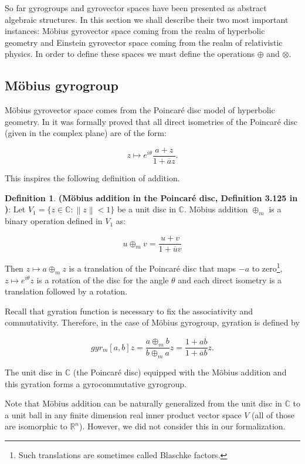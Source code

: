\documentclass[a4paper]{article}
\theoremstyle{definition}
\newtheorem{definition}{Definition}[section]
\newcommand{\norm}[1]{\left\lVert#1\right\rVert}
\begin{document}
So far gyrogroups and gyrovector spaces have been presented as
abstract algebraic structures. In this section we shall describe their
two most important instances: M\"obius gyrovector space coming from
the realm of hyperbolic geometry and Einstein gyrovector space coming
from the realm of relativistic physics. In order to define these
spaces we must define the operations $\oplus$ and $\otimes$.


\subsection{M\"obius gyrogroup}\label{sec:mobiusgyrogroup}

M\"obius gyrovector space comes from the Poincar\'e disc model of
hyperbolic geometry. In \cite{amai-poincare} it was formally proved
that all direct isometries of the Poincar\'e disc (given in the
complex plane) are of the form:

$$z \mapsto e^{i\theta} \frac{a+z}{1+\overline{a}z}.$$

This inspires the following definition of addition.

\begin{definition}\textbf{(M\" obius addition in the Poincar\'e disc, Definition 3.125 in \cite{ungar-analytic})}: Let 
  $V_1 = \{z\in \mathbb{C}: \norm{z} < 1\}$ be a unit disc in
  $\mathbb{C}$. M\" obius addition $\oplus_m$ is a binary operation
  defined in $V_1$ as:
  
  $$u\oplus_m v = \frac{u+v}{1+\overline{u}v}$$
\end{definition}

Then $z \mapsto a \oplus_m z$ is a translation of the Poincar\'e disc
that maps $-a$ to zero\footnote{Such translations are sometimes called
  Blaschke factors.}, $z \mapsto e^{i\theta}z$ is a rotation of the
disc for the angle $\theta$ and each direct isometry is a translation
followed by a rotation.

Recall that gyration function is necessary to fix the associativity
and commutativity. Therefore, in the case of M\"obius gyrogroup,
gyration is defined by

$$gyr_m[a, b] z = \frac{a\oplus_m b}{b\oplus_m a}z = \frac{1 + a\overline{b}}{1+\overline{a}b}z.$$

The unit disc in $\mathbb{C}$ (the Poincar\'e disc) equipped with the
M\"obius addition and this gyration forms a gyrocommutative gyrogroup.


Note that M\"obius addition can be naturally generalized from the unit
disc in $\mathbb{C}$ to a unit ball in any finite dimension real inner
product vector space $V$ (all of those are isomorphic to
$\mathbb{R}^n$). However, we did not consider this in our
formalization.
\end{document}
